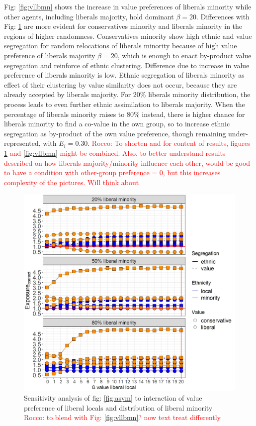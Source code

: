 \documentclass{article}
\newcommand{\rocco}[1]{{\textcolor{red}{Rocco: #1}}} %
\begin{document}
Fig: \ref{fig:vllbmn} shows the increase in value preferences of liberals minority while other agents, including liberals majority, hold dominant $\beta = 20$. Differences with Fig: \ref{fig:vllblc} are more evident for conservatives minority and liberals minority in the regions of higher randomness. Conservatives minority show high ethnic and value segregation for random relocations of liberals minority because of high value preference of liberals majority $\beta = 20$, which is enough to enact by-product value segregation and reinforce of ethnic clustering. Difference due to increase in value preference of liberals minority is low. Ethnic segregation of liberals minority as effect of their clustering by value similarity does not occur, because they are already accepted by liberals majority. For $20 \%$ liberals minority distribution, the process leads to even further ethnic assimilation to liberals majority. When the percentage of liberals minority raises to $80 \%$ instead, there is higher chance for liberals minority to find a co-value in the own group, so to increase ethnic segregation as by-product of the own value preference, though remaining under-represented, with $E_i = 0.30$.
\rocco{To shorten and for content of results, figures \ref{fig:vllblc} and \ref{fig:vllbmn} might be combined. Also, to better understand results described on how liberals majority/minority influence each other, would be good to have a condition with other-group preference = 0, but this increases complexity of the pictures. Will think about}

\begin{figure}[H]
    \centering
    \includegraphics[scale=0.5]{material/figures/vllblc.jpg}
    \caption{Sensitivity analysis of fig: \ref{fig:asym} to interaction of value preference of liberal locals and distribution of liberal minority \rocco{to blend with Fig: \ref{fig:vllbmn}? now text treat differently}}
    \label{fig:vllblc}
\end{figure} %
\end{document}
